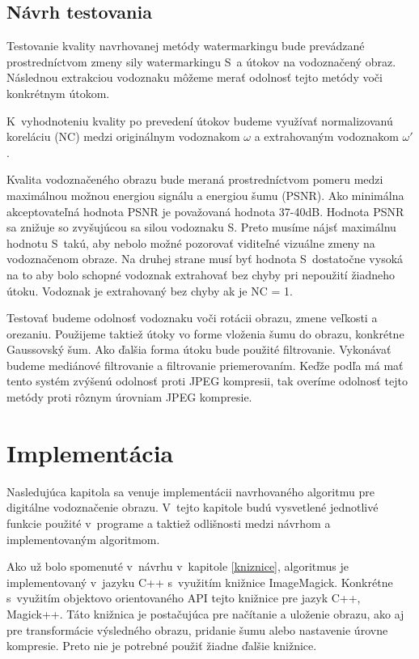 \section{Návrh testovania}
Testovanie kvality navrhovanej metódy watermarkingu bude prevádzané prostredníctvom zmeny sily watermarkingu S~a útokov na vodoznačený obraz. Následnou extrakciou vodoznaku môžeme merať odolnosť tejto metódy voči konkrétnym útokom.

K~vyhodnoteniu kvality po prevedení útokov budeme využívať normalizovanú koreláciu (NC) medzi originálnym vodoznakom $\omega$ a extrahovaným vodoznakom $\omega'$.

Kvalita vodoznačeného obrazu bude meraná prostredníctvom pomeru medzi maximálnou možnou energiou signálu a energiou šumu (PSNR). Ako minimálna akceptovateľná hodnota PSNR je považovaná hodnota 37-40dB. Hodnota PSNR sa znižuje so zvyšujúcou sa silou vodoznaku S. Preto musíme nájsť maximálnu hodnotu S~takú, aby nebolo možné pozorovať viditeľné vizuálne zmeny na vodoznačenom obraze. Na druhej strane musí byť hodnota S~dostatočne vysoká na to aby bolo schopné vodoznak extrahovať bez chyby pri nepoužití žiadneho útoku. Vodoznak je extrahovaný bez chyby ak je NC = 1.

Testovať budeme odolnosť vodoznaku voči rotácii obrazu, zmene veľkosti a orezaniu. Použijeme taktiež útoky vo forme vloženia šumu do obrazu, konkrétne Gaussovský šum. Ako ďalšia forma útoku bude použité filtrovanie. Vykonávať budeme mediánové filtrovanie a filtrovanie priemerovaním. Keďže podľa \cite{QRdecomposition} má mať tento systém zvýšenú odolnosť proti JPEG kompresii, tak overíme odolnosť tejto metódy proti rôznym úrovniam JPEG kompresie.

\chapter{Implementácia}
Nasledujúca kapitola sa venuje implementácii navrhovaného algoritmu pre digitálne vodoznačenie obrazu. V~tejto kapitole budú vysvetlené jednotlivé funkcie použité v~programe a taktiež odlišnosti medzi návrhom a implementovaným algoritmom.

Ako už bolo spomenuté v~návrhu v~kapitole \ref{kniznice}, algoritmus je implementovaný v~jazyku C++ s~využitím knižnice ImageMagick. Konkrétne s~využitím objektovo orientovaného API tejto knižnice pre jazyk C++, Magick++. Táto knižnica je postačujúca pre načítanie a uloženie obrazu, ako aj pre transformácie výsledného obrazu, pridanie šumu alebo nastavenie úrovne kompresie. Preto nie je potrebné použiť žiadne ďalšie knižnice.

